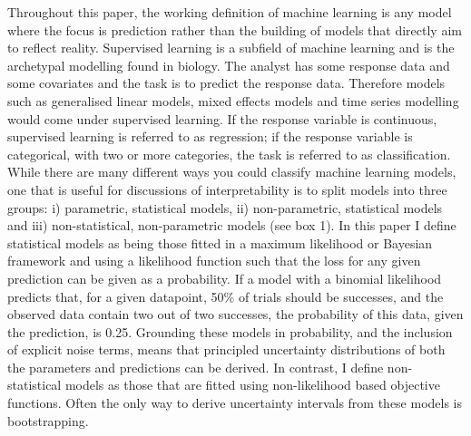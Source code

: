 \documentclass[12pt,]{article}
\begin{document}
Throughout this paper, the working definition of machine learning is any model where the focus is prediction rather than the building of models that directly aim to reflect reality.
Supervised learning is a subfield of machine learning and is the archetypal modelling found in biology.
The analyst has some response data and some covariates and the task is to predict the response data.
Therefore models such as generalised linear models, mixed effects models and time series modelling would come under supervised learning.
If the response variable is continuous, supervised learning is referred to as regression; if the response  variable is categorical, with two or more categories, the task is referred to as classification.
While there are many different ways you could classify machine learning models, one that is useful for discussions of interpretability is to split models into three groups: i) parametric, statistical models, ii) non-parametric, statistical models and iii) non-statistical, non-parametric models (see box 1).
In this paper I define statistical models as being those fitted in a maximum likelihood or Bayesian framework and using a likelihood function such that the loss for any given prediction can be given as a probability.
If a model with a binomial likelihood predicts that, for a  given datapoint, 50\% of trials should be successes, and the observed data contain two out of two successes, the probability of this data, given the prediction, is 0.25.
Grounding these models in probability, and the inclusion of explicit noise terms, means that principled uncertainty distributions of both the parameters and predictions can be derived.
In contrast, I define non-statistical models as those that are fitted using non-likelihood based objective functions.
Often the only way to derive uncertainty intervals from these models is bootstrapping.
\end{document}
